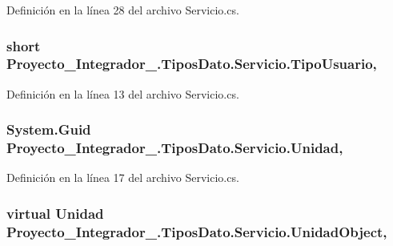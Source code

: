 Definición en la línea 28 del archivo Servicio.\-cs.

\hypertarget{class_proyecto___integrador__3_1_1_tipos_dato_1_1_servicio_a756753eda712db3ba3d85b87bd35ba3a}{
\subsubsection[{Tipo\-Usuario}]{\setlength{\rightskip}{0pt plus 5cm}short Proyecto\-\_\-\-Integrador\-\_.\-Tipos\-Dato.\-Servicio.\-Tipo\-Usuario\hspace{0.3cm}{\ttfamily [get]}, {\ttfamily [set]}}}\label{class_proyecto___integrador__3_1_1_tipos_dato_1_1_servicio_a756753eda712db3ba3d85b87bd35ba3a}


Definición en la línea 13 del archivo Servicio.\-cs.

\hypertarget{class_proyecto___integrador__3_1_1_tipos_dato_1_1_servicio_a44520809b1552502c483547044c33d6e}{
\subsubsection[{Unidad}]{\setlength{\rightskip}{0pt plus 5cm}System.\-Guid Proyecto\-\_\-\-Integrador\-\_.\-Tipos\-Dato.\-Servicio.\-Unidad\hspace{0.3cm}{\ttfamily [get]}, {\ttfamily [set]}}}\label{class_proyecto___integrador__3_1_1_tipos_dato_1_1_servicio_a44520809b1552502c483547044c33d6e}


Definición en la línea 17 del archivo Servicio.\-cs.

\hypertarget{class_proyecto___integrador__3_1_1_tipos_dato_1_1_servicio_acc976af62324d86c48a8143ae605dc07}{
\subsubsection[{Unidad\-Object}]{\setlength{\rightskip}{0pt plus 5cm}virtual {\bf Unidad} Proyecto\-\_\-\-Integrador\-\_.\-Tipos\-Dato.\-Servicio.\-Unidad\-Object\hspace{0.3cm}{\ttfamily [get]}, {\ttfamily [set]}}}\label{class_proyecto___integrador__3_1_1_tipos_dato_1_1_servicio_acc976af62324d86c48a8143ae605dc07}


